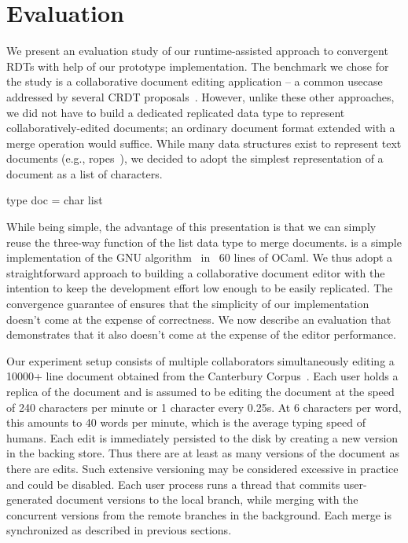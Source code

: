 \section{Evaluation}
\label{sec:eval}

We present an evaluation study of our runtime-assisted approach to
convergent RDTs with help of our prototype \quark implementation. The
benchmark we chose for the study is a collaborative document editing
application -- a common usecase addressed by several CRDT
proposals~\cite{rga, treedoc, crdts}. However, unlike these
other approaches, we did not have to build a dedicated replicated data
type to represent collaboratively-edited documents; an ordinary
document format extended with a merge operation would suffice. While
many data structures exist to represent text documents (e.g.,
ropes~\cite{rope}), we decided to adopt the simplest representation of
a document as a list of characters. 
\begin{center}
\begin{ocaml}
        type doc = char list
\end{ocaml}
\end{center}
While being simple, the advantage of this presentation is that we can
simply reuse the three-way  function of the list data
type to merge documents.  is a simple implementation of
the GNU  algorithm~\cite{gnudiff} in ~60 lines of OCaml. We
thus adopt a straightforward approach to building a collaborative
document editor with the intention to keep the development effort low
enough to be easily replicated. The convergence guarantee of \quark
ensures that the simplicity of our implementation doesn't come at the
expense of correctness. We now describe an evaluation that
demonstrates that it also doesn't come at the expense of the editor
performance.

Our experiment setup consists of multiple collaborators simultaneously
editing a 10000+ line document obtained from the Canterbury
Corpus~\cite{canterbury}. Each user holds a replica of the document
and is assumed to be editing the document at the speed of 240
characters per minute or 1 character every 0.25s. At 6 characters per
word, this amounts to 40 words per minute, which is the average typing
speed of humans. Each edit is immediately persisted to the disk by
creating a new version in the backing store. Thus there are at least
as many versions of the document as there are edits. Such extensive
versioning may be considered excessive in practice and could be
disabled. Each user process runs a \quark thread that commits
user-generated document versions to the local branch, while
merging with the concurrent versions from the remote branches in the
background. Each merge is synchronized as described in previous
sections.

